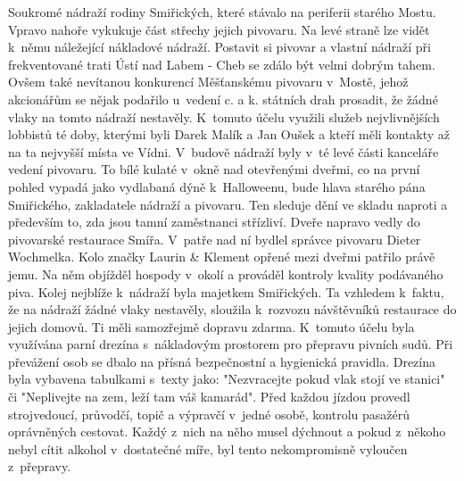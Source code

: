 
Soukromé nádraží rodiny Smiřických, které stávalo na periferii starého
Mostu. Vpravo nahoře vykukuje část střechy jejich pivovaru. Na levé
straně lze vidět k~němu náležející nákladové nádraží. Postavit si
pivovar a vlastní nádraží při frekventované trati Ústí nad Labem -
Cheb se zdálo být velmi dobrým tahem. Ovšem také nevítanou konkurencí
Měšťanskému pivovaru v~Mostě, jehož akcionářům se nějak podařilo
u~vedení c. a k. státních drah prosadit, že žádné vlaky na tomto nádraží
nestavěly. K~tomuto účelu využili služeb nejvlivnějších lobbistů té
doby, kterými byli Darek Malík a Jan Oušek a kteří měli kontakty až na
ta nejvyšší místa ve Vídni. V~budově nádraží byly v~té levé části
kanceláře vedení pivovaru. To bílé kulaté v~okně nad otevřenými
dveřmi, co na první pohled vypadá jako vydlabaná dýně k~Halloweenu,
bude hlava starého pána Smiřického, zakladatele nádraží a pivovaru.
Ten sleduje dění ve skladu naproti a především to, zda jsou tamní
zaměstnanci střízliví. Dveře napravo vedly do pivovarské restaurace
Smířa. V~patře nad ní bydlel správce pivovaru Dieter Wochmelka. Kolo
značky Laurin & Klement opřené mezi dveřmi patřilo právě jemu. Na něm
objížděl hospody v~okolí a prováděl kontroly kvality podávaného piva.
Kolej nejblíže k~nádraží byla majetkem Smiřických. Ta vzhledem
k~faktu, že na nádraží žádné vlaky nestavěly, sloužila k~rozvozu
návštěvníků restaurace do jejich domovů. Ti měli samozřejmě dopravu
zdarma. K~tomuto účelu byla využívána parní drezína s~nákladovým
prostorem pro přepravu pivních sudů. Při převážení osob se dbalo na
přísná bezpečnostní a hygienická pravidla. Drezína byla vybavena
tabulkami s~texty jako: "Nezvracejte pokud vlak stojí ve stanici" či
"Neplivejte na zem, leží tam váš kamarád". Před každou jízdou provedl
strojvedoucí, průvodčí, topič a výpravčí v~jedné osobě, kontrolu
pasažérů oprávněných cestovat. Každý z~nich na něho musel dýchnout a
pokud z~někoho nebyl cítit alkohol v~dostatečné míře, byl tento
nekompromisně vyloučen z~přepravy.

